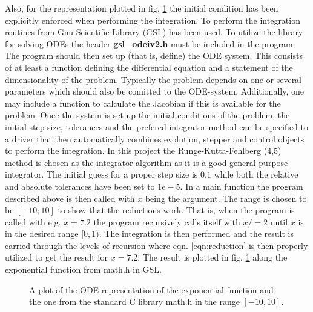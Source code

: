 \documentclass[onecolumn]{article}
\begin{document}
Also, for the representation plotted in fig. \ref{fig:exp} the initial condition has been explicitly enforced when performing the integration.
To perform the integration routines from Gnu Scientific Library (GSL) has been used. To utilize the library for solving ODEs the header
\textbf{gsl\_odeiv2.h} must be included in the program. The program should then set up (that is, define) the ODE system. This consists of 
at least a function defining the differential equation and a statement of the dimensionality of the problem. Typically the problem depends
on one or several parameters which should also be comitted to the ODE-system. Additionally, one may include a function to calculate the Jacobian
if this is available for the problem. Once the system is set up the initial conditions of the problem, the initial step size, tolerances and 
the prefered integrator method can be specified to a driver that then automatically combines evolution, stepper and control objects to perform
the integration.
In this project the Runge-Kutta-Fehlberg (4,5) method is chosen as the integrator algorithm as it is a good general-purpose integrator.
The initial guess for a proper step size is $0.1$ while both the relative and absolute tolerances have been set to $1\mathrm{e}-5$. In a main
function the program described above is then called with $x$ being the argument. The range is chosen to be $[-10;10]$ to show that the reductions
work. That is, when the program is called with e.g. $x=7.2$ the program recursively calls itself with $x/=2$ until $x$ is in the desired range
$[0,1)$. The integration is then performed and the result is carried through the levels of recursion where eqn. \ref{eqn:reduction} is then
properly utilized to get the result for $x=7.2$. The result is plotted in fig. \ref{fig:exp} along the exponential function from math.h in GSL.

\begin{figure}

	\caption{A plot of the ODE representation of the exponential function and the one from the standard C library math.h in the range
		$[-10,10]$.}
\label{fig:exp}
\end{figure}
\end{document}
